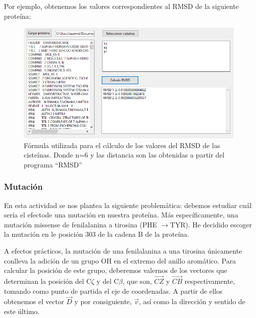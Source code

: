 \documentclass[12pt]{article}
\begin{document}
Por ejemplo, obtenemos los valores correspondientes al RMSD de la siguiente proteína:

\begin{figure}[H]
\centering
\includegraphics[scale=0.8]{Screenshot_43}
\caption{Fórmula utilizada para el cálculo de los valores del RMSD de las cisteínas. Donde n=6 y las distancia son las obtenidas a partir del programa ``RMSD''}
\end{figure}

\subsubsection{Mutación}

En esta actividad se nos plantea la siguiente problemática: debemos estudiar cuál sería el efectode una mutación en nuestra proteína. Más específicamente, una mutación missense de fenilalanina a tirosina (PHE $\rightarrow$TYR). He decidido escoger la mutación en le posición 303 de la cadena B de la proteína.
\newline

A efectos prácticos, la mutación de una fenilalanina a una tirosina únicamente conlleva la adición de un grupo OH en el extremo del anillo aromático. Para calcular la posición de este grupo, deberemos valernos de los vectores que determinan la posición del C$\zeta$ y del C$\beta$, que son, $\overrightarrow{CZ}$ y $\overrightarrow{CB}$ respectivamente, tomando como punto de partida el eje de coordenadas. A partir de ellos obtenemos el vector $\overrightarrow{D}$ y por consiguiente, $\overrightarrow{v}$, así como la dirección y sentido de este último.
\newline 
\end{document}

